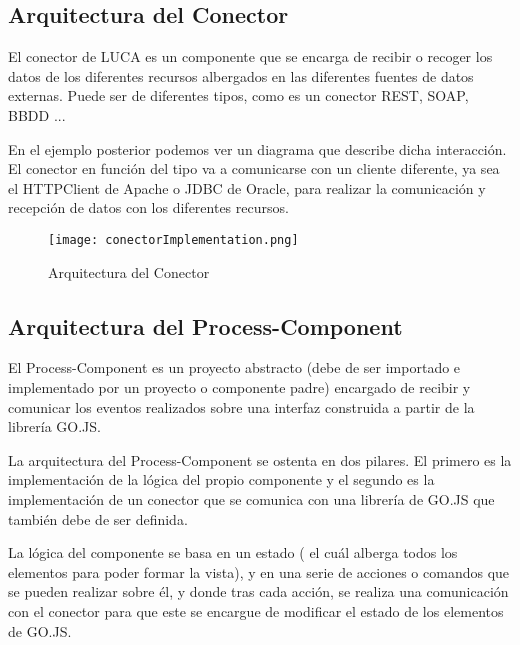 \subsection{Arquitectura del Conector}


El conector de LUCA es un componente que se encarga de recibir o recoger los datos de los diferentes recursos albergados en las diferentes fuentes de datos externas. Puede ser de diferentes tipos, como es un conector REST, SOAP, BBDD ... 

\vspace{5mm}

En el ejemplo posterior podemos ver un diagrama que describe dicha interacción. El conector en función del tipo va a comunicarse con un cliente diferente, ya sea el HTTPClient \cite{httpclient} de Apache o JDBC \cite{jdbc} de Oracle, para realizar la comunicación y recepción de datos con los diferentes recursos.

\begin{figure}[H]
	\centering
	\texttt{[image: conectorImplementation.png]}
	\caption{Arquitectura del Conector}\label{fig:conectorImplementation}
\end{figure}

\subsection{Arquitectura del Process-Component}

El Process-Component es un proyecto abstracto (debe de ser importado e implementado por un proyecto o componente padre) encargado de recibir y comunicar los eventos realizados sobre una interfaz construida a partir de la librería GO.JS.

\vspace{5mm}

La arquitectura del Process-Component se ostenta en dos pilares. El primero es la implementación de la lógica del propio componente y el segundo es la implementación de un conector que se comunica con una librería de GO.JS que también debe de ser definida.

\vspace{5mm}

La lógica del componente se basa en un estado ( el cuál alberga todos los elementos para poder formar la vista), y en una serie de acciones o comandos que se pueden realizar sobre él, y donde tras cada acción, se realiza una comunicación con el conector para que este se encargue de modificar el estado de los elementos de GO.JS.

